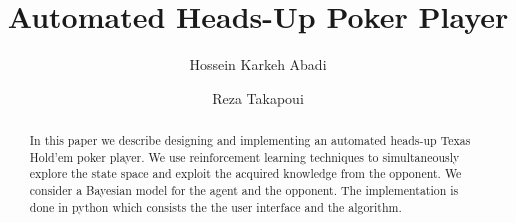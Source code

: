 \documentclass[12pt]{article}
\title{Automated Heads-Up Poker Player}
\author{Hossein Karkeh Abadi \and Reza Takapoui}
\begin{document}
\maketitle

\begin{abstract}
In this paper we describe designing and implementing an automated 
heads-up Texas Hold'em poker player. We use reinforcement learning
techniques to simultaneously explore the state space and exploit the
acquired knowledge from the opponent. We consider a Bayesian model
for the agent and the opponent. 
The implementation is done in
python which consists the the user interface and the algorithm. 
\end{abstract}

 




\end{document}
